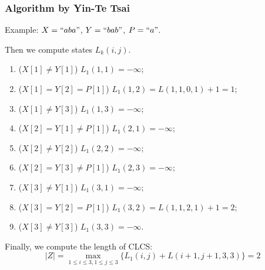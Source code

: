 \documentclass[10pt]{beamer}
\begin{document}
\begin{frame}
  \frametitle{Algorithm by Yin-Te Tsai}
Example: $X=``aba"$, $Y=``bab"$, $P=``a"$.

Then we compute states $L_k(i,j)$.

\begin{enumerate}
	\item<2-> ($X[1]\neq Y[1]$) $L_{1}(1,1) = -\infty$;
	\item<3-> ($X[1]=Y[2]=P[1]$) $L_{1}(1,2)=L(1,1,0,1) + 1 = 1$;
	\item<4-> ($X[1]\neq Y[3]$) $L_{1}(1,3)=-\infty$;
	\item<5-> ($X[2]=Y[1]\neq P[1]$) $L_{1}(2,1) = -\infty$;
	\item<6-> ($X[2]\neq Y[2]$) $L_{1}(2,2)=-\infty$;
	\item<7-> ($X[2]=Y[3]\neq P[1]$) $L_{1}(2,3)=-\infty$;
	\item<8-> ($X[3]\neq Y[1]$) $L_{1}(3,1)=-\infty$;
	\item<9-> ($X[3]=Y[2]=P[1]$) $L_{1}(3,2) = L(1,1,2,1) +1 = 2$;
	\item<10-> ($X[3]\neq Y[3]$) $L_{1}(3,3)=-\infty$.
\end{enumerate}

\pause\pause\pause\pause\pause\pause\pause\pause\pause\pause

Finally, we compute the length of CLCS: 
\[|Z| = \max_{1\le i\le 3, 1\le j\le 3} \{L_{1}(i,j)+L(i+1, j+1, 3,3)\}=2\]

\end{frame}
\end{document}
